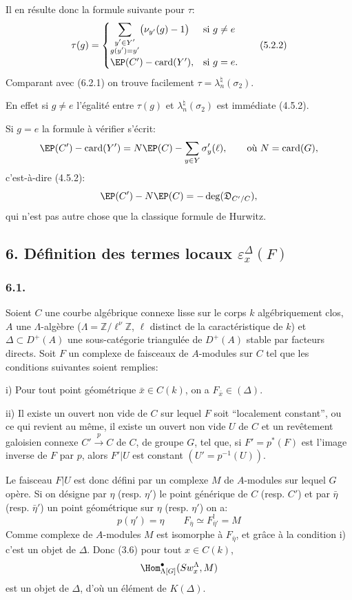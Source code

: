 Il en résulte donc la formule suivante pour $\tau$:
\[
\tau(g)=
\begin{cases}
\displaystyle\sum_{\substack{y'\in Y'\\g(y')=y'}}\bigl(\nu_{y'}(g)-1\bigr)& \text{si } g\ne e\\[0.8em]
\EP(C')-\operatorname{card}(Y'),& \text{si } g=e.
\end{cases}
\tag{5.2.2}
\]
Comparant avec (6.2.1) on trouve facilement $\tau=\lambda_n^\natural(\sigma_2)$.

En effet si $g\ne e$ l'égalité entre $\tau(g)$ et $\lambda_n^\natural(\sigma_2)$ est immédiate (4.5.2).

Si $g=e$ la formule à vérifier s'écrit:
\[
\EP(C')-\operatorname{card}(Y')
=
N\EP(C)-\sum_{y\in Y}\sigma'_y(\ell),
\qquad\text{où } N=\operatorname{card}(G),
\]
c'est-à-dire (4.5.2):
\[
\EP(C')-N\EP(C)=-\deg(\mathfrak{D}_{C'/C}),
\]
qui n'est pas autre chose que la classique formule de Hurwitz.

\subsection*{6. Définition des termes locaux $\varepsilon_x^\Delta(F)$}

\subsubsection*{6.1.}

Soient $C$ une courbe algébrique connexe lisse sur le corps $k$ algébriquement clos, $A$ une $\Lambda$-algèbre ($\Lambda=\mathbb{Z}/\ell^\nu\mathbb{Z}$, $\ell$ distinct de la caractéristique de $k$) et $\Delta\subset D^+(A)$ une sous-catégorie triangulée de $D^+(A)$ stable par facteurs directs. Soit $F$ un complexe de faisceaux de $A$-modules sur $C$ tel que les conditions suivantes soient remplies:

i) Pour tout point géométrique $\bar x\in C(k)$, on a $F_{\bar x}\in(\Delta)$.

ii) Il
existe un ouvert non vide de $C$ sur lequel $F$ soit ``localement constant'', ou ce qui revient au même, il existe un ouvert non vide $U$ de $C$ et un revêtement galoisien connexe $C'\xrightarrow{p}C$ de $C$, de groupe $G$, tel que, si $F'=p^*(F)$ est l'image inverse de $F$ par $p$, alors $F'|U$ est constant $(U'=p^{-1}(U))$.

Le faisceau $F|U$ est donc défini par un complexe $M$ de $A$-modules sur lequel $G$ opère. Si on désigne par $\eta$ (resp. $\eta'$) le point générique de $C$ (resp. $C'$) et par $\bar\eta$ (resp. $\bar\eta'$) un point géométrique sur $\eta$ (resp. $\eta'$) on a:
\[
p(\eta')=\eta\qquad
F_{\bar\eta}\simeq F^{!}_{\bar\eta'}=M
\tag{6.1.1}
\]
Comme complexe de $A$-modules $M$ est isomorphe à $F_{\bar\eta}$, et grâce à la condition i) c'est un objet de $\Delta$. Donc (3.6) pour tout $x\in C(k)$,
\[
\Hom^\bullet_{\Lambda[G]}(Sw_x^\Lambda,M)
\]
est un objet de $\Delta$, d'où un élément de $K(\Delta)$.

